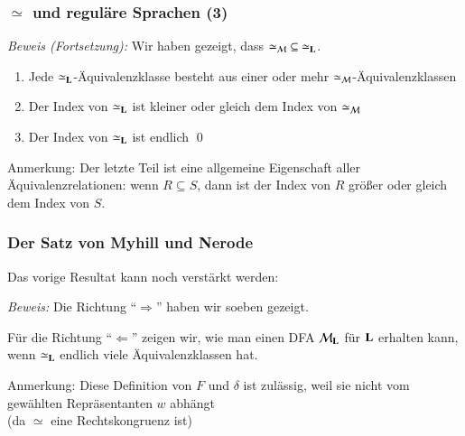 \documentclass[onlymath]{beamer}
\begin{document}
\begin{frame}[t]\frametitle{$\simeq$ und reguläre Sprachen (3)}


\emph{Beweis (Fortsetzung):} Wir haben gezeigt, dass ${\simeq_{\mathcal{M}}}\subseteq {\simeq_{\textbf{\textcolor{black}{L}}}}$.\pause
\medskip

\begin{enumerate}[$\leadsto$]
\item Jede ${\simeq_{\textbf{\textcolor{black}{L}}}}$-Äquivalenzklasse besteht aus einer oder mehr ${\simeq_{\mathcal{M}}}$-Äquivalenzklassen\pause
\item Der Index von ${\simeq_{\textbf{\textcolor{black}{L}}}}$ ist kleiner oder gleich dem Index von ${\simeq_{\mathcal{M}}}$\pause
\item Der Index von ${\simeq_{\textbf{\textcolor{black}{L}}}}$ ist endlich \qed
\end{enumerate}
\medskip

\textcolor{devilscss}{\footnotesize Anmerkung: Der letzte Teil ist eine allgemeine Eigenschaft aller Äquivalenzrelationen: wenn $R\subseteq S$, dann ist der Index von $R$ größer oder gleich dem Index von $S$.}

\end{frame}

\begin{frame}[t]\frametitle{Der Satz von Myhill und Nerode}

Das vorige Resultat kann noch verstärkt werden:

\pause

\emph{Beweis:}
Die Richtung "`$\Rightarrow$"' haben wir soeben gezeigt.\pause\medskip

Für die Richtung "`$\Leftarrow$"' zeigen wir, wie man einen DFA $\mathcal{M}_{\textbf{\textcolor{black}{L}}}$ für $\textbf{\textcolor{black}{L}}$ erhalten kann, wenn $\simeq_{\textbf{\textcolor{black}{L}}}$ endlich viele Äquivalenzklassen hat.\pause

\vspace{-1ex}
{\tiny Anmerkung: Diese Definition von $F$ und $\delta$ ist zulässig, weil sie nicht vom gewählten Repräsentanten $w$ abhängt}\\[-1.5ex]{\tiny (da $\simeq$ eine Rechtskongruenz ist)}

\end{frame}
\end{document}
